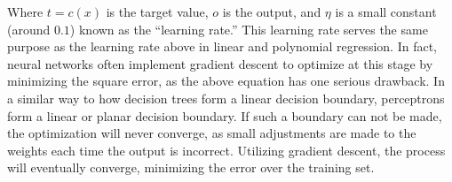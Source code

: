 Where \(t = c(x)\) is the target value, \(o\) is the output, and \(\eta\) is a small constant (around \(0.1\)) known as the ``learning rate.'' This learning rate serves the same purpose as the learning rate above in linear and polynomial regression. In fact, neural networks often implement gradient descent to optimize at this stage by minimizing the square error, as the above equation has one serious drawback. In a similar way to how decision trees form a linear decision boundary, perceptrons form a linear or planar decision boundary. If such a boundary can not be made, the optimization will never converge, as small adjustments are made to the weights each time the output is incorrect. Utilizing gradient descent, the process will eventually converge, minimizing the error over the training set. 



